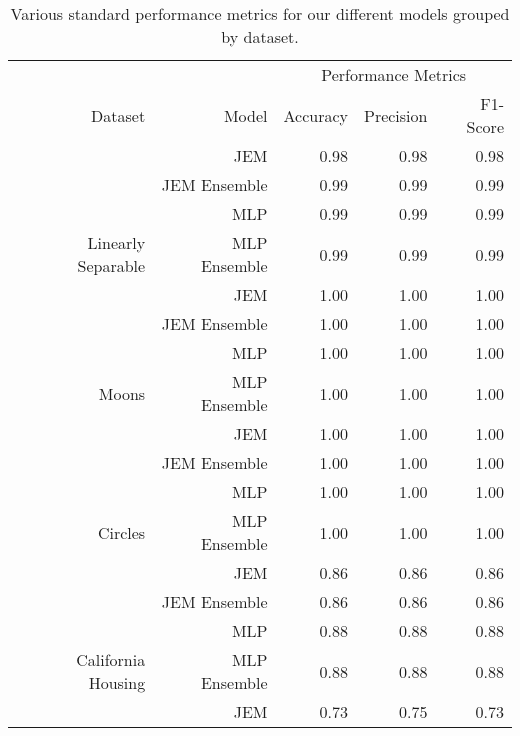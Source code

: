 \begin{table}

\caption{Various standard performance metrics for our different models grouped by dataset. \label{tab:perf} \newline}
\centering
\fontsize{8}{10}\selectfont
\begin{tabular}[t]{rrrrr}
\toprule
\multicolumn{2}{c}{ } & \multicolumn{3}{c}{Performance Metrics} \\
\cmidrule(l{3pt}r{3pt}){3-5}
Dataset & Model & Accuracy & Precision & F1-Score\\
\midrule
 & JEM & 0.98 & 0.98 & 0.98\\

 & JEM Ensemble & 0.99 & 0.99 & 0.99\\

 & MLP & 0.99 & 0.99 & 0.99\\

\multirow[t]{-4}{*}{\raggedleft\arraybackslash Linearly Separable} & MLP Ensemble & 0.99 & 0.99 & 0.99\\
\cmidrule{1-5}
 & JEM & 1.00 & 1.00 & 1.00\\

 & JEM Ensemble & 1.00 & 1.00 & 1.00\\

 & MLP & 1.00 & 1.00 & 1.00\\

\multirow[t]{-4}{*}{\raggedleft\arraybackslash Moons} & MLP Ensemble & 1.00 & 1.00 & 1.00\\
\cmidrule{1-5}
 & JEM & 1.00 & 1.00 & 1.00\\

 & JEM Ensemble & 1.00 & 1.00 & 1.00\\

 & MLP & 1.00 & 1.00 & 1.00\\

\multirow[t]{-4}{*}{\raggedleft\arraybackslash Circles} & MLP Ensemble & 1.00 & 1.00 & 1.00\\
\cmidrule{1-5}
 & JEM & 0.86 & 0.86 & 0.86\\

 & JEM Ensemble & 0.86 & 0.86 & 0.86\\

 & MLP & 0.88 & 0.88 & 0.88\\

\multirow[t]{-4}{*}{\raggedleft\arraybackslash California Housing} & MLP Ensemble & 0.88 & 0.88 & 0.88\\
\cmidrule{1-5}
 & JEM & 0.73 & 0.75 & 0.73\\


\end{tabular}
\end{table}
